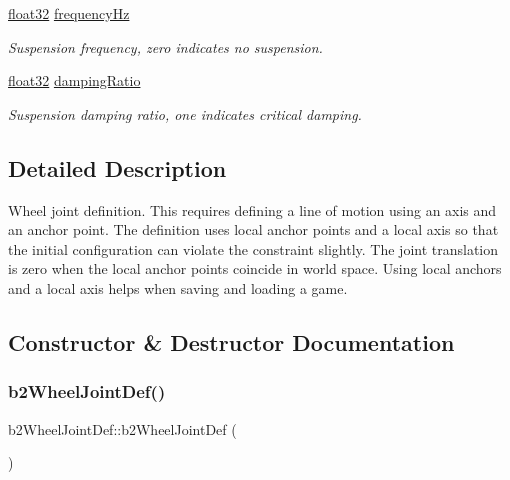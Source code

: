 \begin{DoxyCompactItemize}
\mbox{\hyperlink{b2_settings_8h_aacdc525d6f7bddb3ae95d5c311bd06a1}{float32}} \mbox{\hyperlink{structb2_wheel_joint_def_acf3540f46eaf3bc91426386939bd37b1}{frequency\+Hz}}
\begin{DoxyCompactList}\small\item\em Suspension frequency, zero indicates no suspension. \end{DoxyCompactList}\item 
\mbox{\hyperlink{b2_settings_8h_aacdc525d6f7bddb3ae95d5c311bd06a1}{float32}} \mbox{\hyperlink{structb2_wheel_joint_def_a9976584bfee18b46dec355764797ce54}{damping\+Ratio}}
\begin{DoxyCompactList}\small\item\em Suspension damping ratio, one indicates critical damping. \end{DoxyCompactList}\end{DoxyCompactItemize}


\subsection{Detailed Description}
Wheel joint definition. This requires defining a line of motion using an axis and an anchor point. The definition uses local anchor points and a local axis so that the initial configuration can violate the constraint slightly. The joint translation is zero when the local anchor points coincide in world space. Using local anchors and a local axis helps when saving and loading a game. 

\subsection{Constructor \& Destructor Documentation}
\mbox{\label{structb2_wheel_joint_def_a3da0f9e8e69eb228c6b24b851802da88}} 
\subsubsection{\texorpdfstring{b2WheelJointDef()}{b2WheelJointDef()}}
{\footnotesize\ttfamily b2\+Wheel\+Joint\+Def\+::b2\+Wheel\+Joint\+Def (\begin{DoxyParamCaption}{ }\end{DoxyParamCaption})\hspace{0.3cm}{\ttfamily [inline]}}



